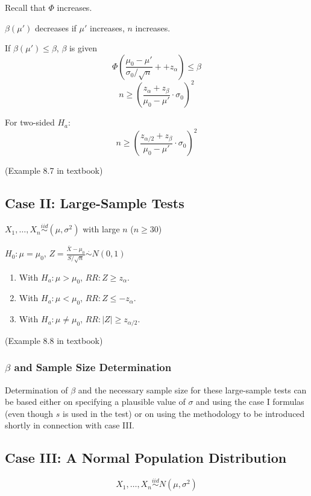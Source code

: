 Recall that $\Phi$ increases.

$\beta(\mu')$ decreases if $\mu'$ increases, $n$ increases.

If $\beta(\mu')\leq \beta$, $\beta$ is given
\[ \Phi\left( \frac{\mu_0-\mu'}	{\sigma_0/\sqrt{n} }++z_{\alpha}  \right)\leq \beta\]
\[n \geq \left(\frac{z_{\alpha}+ z_{\beta}}{\mu_0-\mu'}\cdot\sigma_0\right)^2\]

For two-sided $H_a$:
\[n \geq \left(\frac{z_{\alpha/2}+ z_{\beta}}{\mu_0-\mu'}\cdot\sigma_0\right)^2\]

\begin{exmp}
(Example 8.7 in textbook)
\end{exmp}

\subsection{Case II: Large-Sample Tests}
$X_1,\dots,X_n \overset{iid}{\sim} (\mu,\sigma^2)$ with large $n$ ($n \geq 30$)

$H_0:\mu=\mu_0$, $Z=\frac{\bar{X}-\mu_0}{S/\sqrt{n}} \overset{\cdot}{\sim}N(0,1)$
\begin{enumerate}
\item With $H_a: \mu>\mu_0$, $RR:Z\geq z_{\alpha}$.
\item With $H_a: \mu<\mu_0$, $RR:Z\leq -z_{\alpha}$.
\item With $H_a: \mu\neq\mu_0$, $RR:|Z|\geq z_{\alpha/2}$.
\end{enumerate}

\begin{exmp}
(Example 8.8 in textbook)
\end{exmp}

\subsubsection{$\beta$ and Sample Size Determination}

Determination of $\beta$ and the necessary sample size for these large-sample tests can be based either on specifying a plausible value of $\sigma$ and using the case I formulas (even though $s$ is used in the test) or on using the methodology to be introduced shortly in connection with case III.

\subsection{Case III: A Normal Population Distribution}
\[X_1,\dots,X_n \overset{iid}{\sim} N(\mu,\sigma^2)\]

